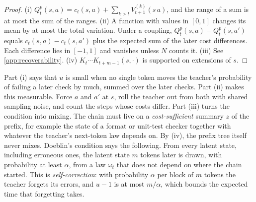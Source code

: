 \begin{proof}
(i) $Q^p_t(s,a)=c_t(s,a)+\sum_{k>t}V^{(k)}_{t+1}(s\,a)$, and the range of a sum is at most the sum of the ranges.
(ii) A function with values in $[0,1]$ changes its mean by at most the total variation. Under a coupling,
$Q^p_t(s,a)-Q^p_t(s,a')$ equals $c_t(s,a)-c_t(s,a')$ plus the expected sum of the later cost differences. Each
difference lies in $[-1,1]$ and vanishes unless $N$ counts it.
(iii) See \cref{app:recoverability}.
(iv) $K_t\cdots K_{t+m-1}(s,\cdot)$ is supported on extensions of $s$.
\end{proof}

\noindent
Part (i) says that $u$ is small when no single token moves the teacher's probability of failing a later
check by much, summed over the later checks. Part (ii) makes this measurable. Force $a$ and $a'$ at $s$, roll
the teacher out from both with shared sampling noise, and count the steps whose costs differ. Part (iii)
turns the condition into mixing. The chain must live on a \emph{cost-sufficient} summary $z$ of the prefix, for
example the state of a format or unit-test checker together with whatever the teacher's next-token law
depends on. By (iv), the prefix tree itself never mixes. Doeblin's condition says the following. From every
latent state, including erroneous ones, the latent state $m$ tokens later is drawn, with probability at least
$\alpha$, from a law $\omega_t$ that does not depend on where the chain started. This is \emph{self-correction}: with
probability $\alpha$ per block of $m$ tokens the teacher forgets its errors, and $u-1$ is at most $m/\alpha$, which
bounds the expected time that forgetting takes.

